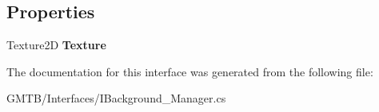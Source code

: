 \subsection*{Properties}
\begin{DoxyCompactItemize}
\item 
\mbox{\label{interface_g_m_t_b_1_1_interfaces_1_1_i_background___manager_ab6182de4f7f90fc0359ad348076b23f6}} 
Texture2D {\bfseries Texture}
\end{DoxyCompactItemize}


The documentation for this interface was generated from the following file\+:\begin{DoxyCompactItemize}
\item 
G\+M\+T\+B/\+Interfaces/I\+Background\+\_\+\+Manager.\+cs\end{DoxyCompactItemize}
